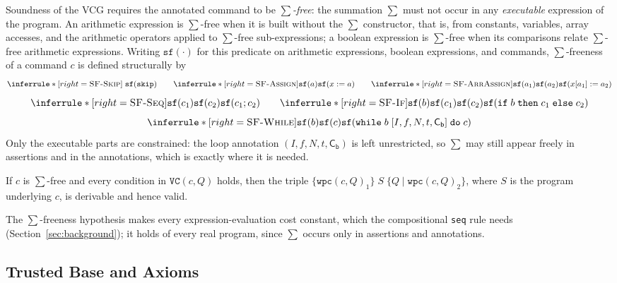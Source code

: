\documentclass[runningheads]{llncs}
\newcommand{\triple}[4]{\{#1\}\;#2\;\{#3 \mid #4\}}
\newcommand{\cst}[1]{\mathsf{C_{#1}}}
\newcommand{\code}[1]{\texttt{#1}}
\begin{document}
Soundness of the VCG requires the annotated command to be \emph{$\sum$-free}: the
summation $\sum$ must not occur in any \emph{executable} expression of the program.
An arithmetic expression is $\sum$-free when it is built without the $\sum$
constructor, that is, from constants, variables, array accesses, and the arithmetic
operators applied to $\sum$-free sub-expressions; a boolean expression is
$\sum$-free when its comparisons relate $\sum$-free arithmetic expressions.
Writing $\code{sf}(\cdot)$ for this predicate on arithmetic expressions, boolean
expressions, and commands, $\sum$-freeness of a command $c$ is defined structurally
by
\[
\inferrule*[right=\textsc{SF-Skip}]{\;}{\code{sf}(\code{skip})}
\qquad
\inferrule*[right=\textsc{SF-Assign}]{\code{sf}(a)}{\code{sf}(x := a)}
\qquad
\inferrule*[right=\textsc{SF-ArrAssign}]
{\code{sf}(a_1) \\ \code{sf}(a_2)}{\code{sf}(x[a_1] := a_2)}
\]
\[
\inferrule*[right=\textsc{SF-Seq}]
{\code{sf}(c_1) \\ \code{sf}(c_2)}{\code{sf}(c_1; c_2)}
\qquad
\inferrule*[right=\textsc{SF-If}]
{\code{sf}(b) \\ \code{sf}(c_1) \\ \code{sf}(c_2)}
{\code{sf}(\code{if}\;b\;\code{then}\;c_1\;\code{else}\;c_2)}
\]
\[
\inferrule*[right=\textsc{SF-While}]
{\code{sf}(b) \\ \code{sf}(c)}
{\code{sf}(\code{while}\;b\;[I,f,N,t,\cst{b}]\;\code{do}\;c)}
\]
Only the executable parts are constrained: the loop annotation
$(I, f, N, t, \cst{b})$ is left unrestricted, so $\sum$ may still appear freely in
assertions and in the annotations, which is exactly where it is needed.

\begin{theorem}[\code{vcg\_sound}, Theorem~1 of~\cite{Silva2022}]\label{thm:vcg}
If $c$ is $\sum$-free and every condition in $\code{VC}(c, Q)$ holds, then the
triple $\triple{\code{wpc}(c,Q)_1}{S}{Q}{\code{wpc}(c,Q)_2}$, where $S$ is the
program underlying $c$, is derivable and hence valid.
\end{theorem}
The $\sum$-freeness hypothesis makes every expression-evaluation cost constant,
which the compositional \code{seq} rule needs (Section~\ref{sec:background}); it
holds of every real program, since $\sum$ occurs only in assertions and
annotations.

\subsection{Trusted Base and Axioms}\label{sec:axioms}
\end{document}
